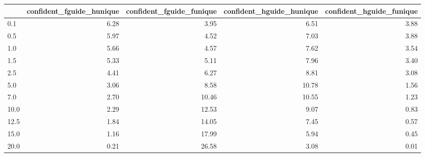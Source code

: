 \begin{tabular}{lrrrr}
\toprule
 & confident_fguide_hunique & confident_fguide_funique & confident_hguide_hunique & confident_hguide_funique \\
\midrule
0.1 & 6.28 & 3.95 & 6.51 & 3.88 \\
0.5 & 5.97 & 4.52 & 7.03 & 3.88 \\
1.0 & 5.66 & 4.57 & 7.62 & 3.54 \\
1.5 & 5.33 & 5.11 & 7.96 & 3.40 \\
2.5 & 4.41 & 6.27 & 8.81 & 3.08 \\
5.0 & 3.06 & 8.58 & 10.78 & 1.56 \\
7.0 & 2.70 & 10.46 & 10.55 & 1.23 \\
10.0 & 2.29 & 12.53 & 9.07 & 0.83 \\
12.5 & 1.84 & 14.05 & 7.45 & 0.57 \\
15.0 & 1.16 & 17.99 & 5.94 & 0.45 \\
20.0 & 0.21 & 26.58 & 3.08 & 0.01 \\
\bottomrule
\end{tabular}
